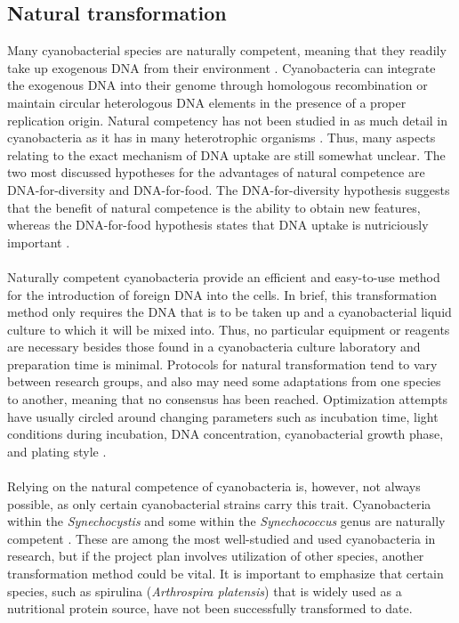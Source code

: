 \subsection{Natural transformation}
Many cyanobacterial species are naturally competent, meaning that they readily take up exogenous DNA from their environment . Cyanobacteria can integrate the exogenous DNA into their genome through homologous recombination or maintain circular heterologous DNA elements in the presence of a proper replication origin. Natural competency has not been studied in as much detail in cyanobacteria as it has in many heterotrophic organisms \parencite{Schirmacher2020}. Thus, many aspects relating to the exact mechanism of DNA uptake are still somewhat unclear. The two most discussed hypotheses for the advantages of natural competence are DNA-for-diversity and DNA-for-food. The DNA-for-diversity hypothesis suggests that the benefit of natural competence is the ability to obtain new features, whereas the DNA-for-food hypothesis states that DNA uptake is nutriciously important \parencite{Schirmacher2020}. \\ \\
Naturally competent cyanobacteria provide an efficient and easy-to-use method for the introduction of foreign DNA into the cells. In brief, this transformation method only requires the DNA that is to be taken up and a cyanobacterial liquid culture to which it will be mixed into. Thus, no particular equipment or reagents are necessary besides those found in a cyanobacteria culture laboratory and preparation time is minimal. Protocols for natural transformation tend to vary between research groups, and also may need some adaptations from one species to another, meaning that no consensus has been reached. Optimization attempts have usually circled around changing parameters such as incubation time, light conditions during incubation, DNA concentration, cyanobacterial growth phase, and plating style \parencite{Zhang2007}. \\ \\
Relying on the natural competence of cyanobacteria is, however, not always possible, as only certain cyanobacterial strains carry this trait. Cyanobacteria within the \textit{Synechocystis} and some within the  \textit{Synechococcus} genus are naturally competent \parencite{Schirmacher2020}. These are among the most well-studied and used cyanobacteria in research, but if the project plan involves utilization of other species, another transformation method could be vital. It is important to emphasize that certain species, such as spirulina (\textit{Arthrospira platensis}) that is widely used as a nutritional protein source, have not been successfully transformed to date. 

